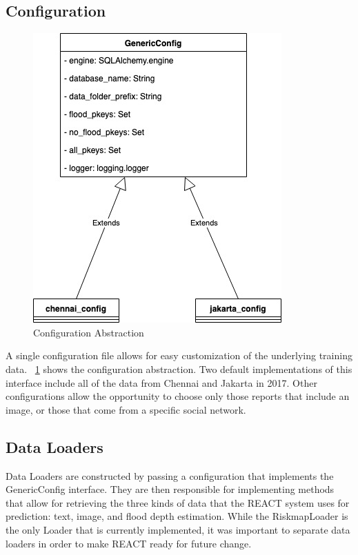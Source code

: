 \subsection{Configuration}
\begin{figure}[h]
    \centering
    \includegraphics[scale=0.6]{images/config.jpg}
    \caption{Configuration Abstraction}\label{fig:config}
\end{figure}
A single configuration file allows for easy customization of the underlying 
training data. \figureautorefname{}~\ref{fig:config} shows the configuration
abstraction. Two default implementations of this interface include all of the
data from Chennai and Jakarta in 2017. Other configurations allow the
opportunity to choose only those reports that include an image, or those that
come from a specific social network.

\subsection{Data Loaders}
Data Loaders are constructed by passing a configuration that implements the 
GenericConfig interface. They are then responsible for implementing methods 
that allow for retrieving the three kinds of data that the REACT system 
uses for prediction: text, image, and flood depth estimation. While the
RiskmapLoader is the only Loader that is currently implemented, it was 
important to separate data loaders in order to make REACT ready for future change.

